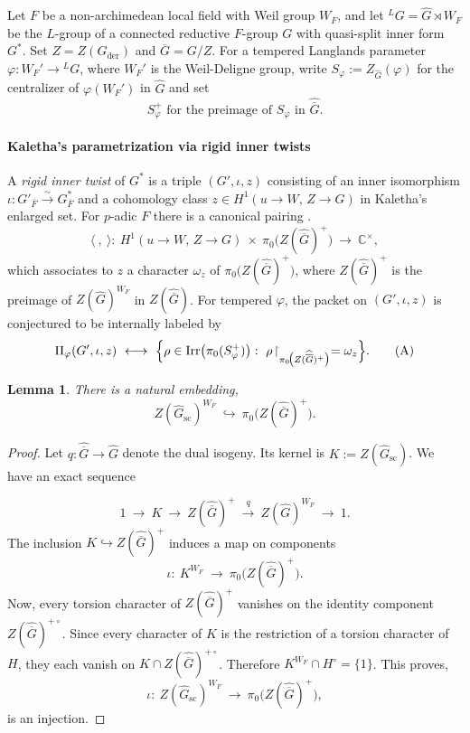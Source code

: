 \documentclass[american]{article}
\numberwithin{equation}{section}
\numberwithin{figure}{section}
\theoremstyle{plain}
\newtheorem{lemma}[theorem]{Lemma}
\theoremstyle{definition}
\theoremstyle{remark}
\begin{document}
Let $F$ be a non-archimedean local field with Weil group $W_F$, and let ${}^{L}G=\widehat G\rtimes W_F$ be the $L$-group of a connected reductive $F$-group $G$ with quasi-split inner form $G^{\ast}$. Set \(Z=Z(G_\mathrm{der})\) and \(\overline{G}=G/Z\). For a tempered Langlands parameter $\varphi:W_F'\to{}^{L}G$, where \(W_F'\) is the Weil-Deligne group, write $S_\varphi:=Z_{\widehat G}(\varphi)$ for the centralizer of $\varphi(W_F')$ in $\widehat G$ and set
\[
  S_\varphi^{+}\text{ for the preimage of }S_\varphi \text{ in }\widehat{\overline{G}}.  
\]

\paragraph{Kaletha's parametrization via rigid inner twists}
A \emph{rigid inner twist} \cite[\S 5]{Kal16} of $G^{\ast}$ is a triple $(G',\iota,z)$ consisting of an inner isomorphism $\iota:G'_{\overline F}\xrightarrow{\sim}G^{\ast}_{\overline F}$ and a cohomology class $z\in H^{1}(u\!\to\!W,\,Z\!\to\!G)$ in Kaletha's enlarged set. For $p$-adic $F$ there is a canonical pairing \cite[Cor. 5.4]{Kal16}.
\[
  \langle\ ,\ \rangle:\ H^{1}(u\!\to\!W,\,Z\!\to\!G)\ \times\ \pi_0\!\bigl(Z(\widehat {\overline{G}})^{+}\bigr)\ \longrightarrow\ \mathbb{C}^{\times},
\]
which associates to $z$ a character $\omega_z$ of $\pi_0\!\bigl(Z(\widehat {\overline{G}})^{+}\bigr)$, where $Z(\widehat {\overline{G}})^{+}$ is the preimage of $Z(\widehat{G})^{W_F}$ in $Z(\widehat {\overline{G}})$. For tempered $\varphi$, the packet on $(G',\iota,z)$ is conjectured to be internally labeled by
\[
  \Pi_\varphi(G',\iota,z)\ \longleftrightarrow\ 
  \Bigl\{\rho\in\mathrm{Irr}\bigl(\pi_0(S_\varphi^{+})\bigr):\ \rho\!\restriction_{\pi_0\!\bigl(Z(\widehat {\overline{G}})^{+}\bigr)}=\omega_z\Bigr\}.
\tag{A}\]

\begin{lemma}
There is a natural embedding, 
\[
Z(\widehat G_{\mathrm{sc}})^{W_F}\ \hookrightarrow\ \pi_0\!\bigl(Z(\widehat{\overline G})^{+}\bigr).
\]
\end{lemma}
\begin{proof}
Let $q:\widehat{\overline G}\to \widehat G$ denote the dual isogeny. Its kernel is $K:=Z(\widehat G_{\mathrm{sc}})$. We have an exact sequence

\[
1\ \longrightarrow\ K\ \longrightarrow\ Z(\widehat{\overline G})^{+}\ \xrightarrow{\,q\,}\ Z(\widehat G)^{W_F}\ \longrightarrow\ 1.
\]
The inclusion $K\hookrightarrow Z(\widehat{\overline G})^{+}$ induces a map on components
$$
\iota:\ K^{W_F}\ \longrightarrow\ \pi_0\!\bigl(Z(\widehat{\overline G})^{+}\bigr).
$$
Now, every torsion character of $Z(\widehat{\overline G})^{+}$ vanishes on the identity component $Z(\widehat{\overline G})^{{+}\circ}$. Since every character of $K$ is the restriction of a torsion character of $H$, they each vanish on \(K\cap Z(\widehat{\overline G})^{{+}\circ}\). Therefore $K^{W_F}\cap H^\circ=\{1\}$. This proves, 
\[
\iota:\ Z(\widehat G_{\mathrm{sc}})^{W_F}\ \longrightarrow\ \pi_0\!\bigl(Z(\widehat{\overline G})^{+}\bigr),
\]
is an injection. 
\end{proof}
\end{document}
